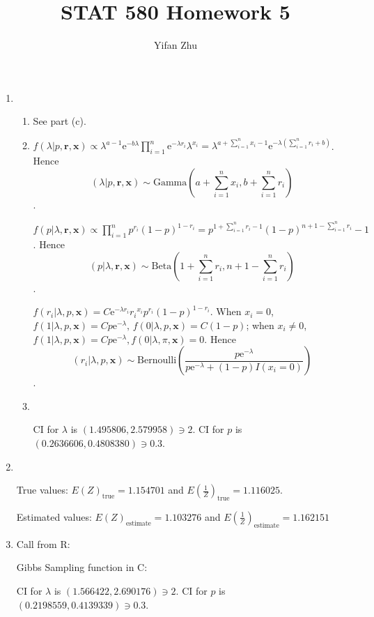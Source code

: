 \documentclass{article}
\begin{document}


	\title{STAT 580 Homework 5}
	\author{Yifan Zhu}
	\maketitle

	\begin{enumerate}[leftmargin = 0 em, label = \arabic*., font = \bfseries]
	\item
	\begin{enumerate}
		\item
		See part (c).
		\item
		$f(\lambda | p, \bm r, \bm x) \propto \lambda^{a-1} \mathrm{e}^{-b \lambda} \prod_{i=1}^n \mathrm{e}^{-\lambda r_i} \lambda^{x_i} = \lambda^{a + \sum_{i=1}^n x_i - 1} \mathrm{e}^{- \lambda (\sum_{i=1}^n r_i + b)}$. Hence $$(\lambda | p, \bm r, \bm x) \sim \mathrm{Gamma}(a + \sum_{i=1}^n x_i , b + \sum_{i=1}^n r_i)$$.

		$f(p|\lambda, \bm r, \bm x) \propto \prod_{i=1}^n p^{r_i} (1 - p)^{1 - r_i} = p^{1 + \sum_{i=1}^n r_i - 1} (1 - p)^{n + 1 - \sum_{i=1}^n r_i} -1$. Hence $$(p | \lambda, \bm r, \bm x) \sim \mathrm{Beta}(1 + \sum_{i=1}^n r_i , n + 1 - \sum_{i=1}^n r_i)$$.

		$f(r_i | \lambda, p, \bm x) = C \mathrm{e}^{- \lambda r_i} {r_i}^{x_i} p^{r_i} (1 - p)^{1 - r_i}$. When $x_i = 0$, $f(1|\lambda, p, \bm x) = C p \mathrm{e}^{- \lambda},\, f(0| \lambda, p, \bm x) = C(1 - p)$; when $x_i \neq 0$, $f(1|\lambda, p, \bm x) = C p \mathrm{e}^{- \lambda}, f(0|\lambda, \pi, \bm x) = 0$. Hence
		$$(r_i | \lambda, p, \bm x) \sim \mathrm{Bernoulli}(\frac{p \mathrm{e}^{- \lambda}}{p \mathrm{e}^{- \lambda} + (1 - p) I(x_i = 0)})$$.

		\item \

		

		CI for $\lambda$ is $(1.495806, 2.579958) \owns 2$.
		CI for $p$ is $(0.2636606, 0.4808380) \owns 0.3$.

	\end{enumerate}


	\newpage
	\item \




	

	True values: $E \left( Z \right)_{\mathrm{true}} = 1.154701 $ and $E \left( \frac{1}{Z} \right)_{\mathrm{true}} = 1.116025 $.

	Estimated values: $E \left( Z \right)_{\mathrm{estimate}} = 1.103276$ and $E \left( \frac{1}{Z} \right)_{\mathrm{estimate}} = 1.162151 $

	\item Call from R:
	

	Gibbs Sampling function in C:
	
	CI for $\lambda$ is $(1.566422, 2.690176) \owns 2$.
	CI for $p$ is $(0.2198559, 0.4139339) \owns 0.3$.
	$ $

 	\end{enumerate}

	
\end{document}
